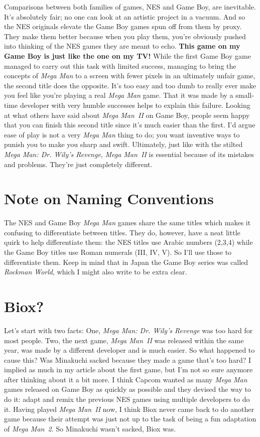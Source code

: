 \documentclass{book}
\begin{document}
Comparisons between both families of games, NES and Game Boy, are inevitable. It’s absolutely fair; no one can look at an artistic project in a vacuum. And so the NES originals elevate the Game Boy games spun off from them by proxy. They make them better because when you play them, you’re obviously pushed into thinking of the NES games they are meant to echo. \textbf{This game on my Game Boy is just like the one on my TV!} While the first Game Boy game managed to carry out this task with limited success, managing to bring the concepts of \emph{Mega Man} to a screen with fewer pixels in an ultimately unfair game, the second title does the opposite. It’s too easy and too dumb to really ever make you feel like you’re playing a real \emph{Mega Man} game. That it was made by a small-time developer with very humble successes helps to explain this failure. Looking at what others have said about \emph{Mega Man II} on Game Boy, people seem happy that you can finish this second title since it’s much easier than the first. I’d argue ease of play is not a very \emph{Mega Man} thing to do; you want inventive ways to punish you to make you sharp and swift. Ultimately, just like with the stilted \emph{Mega Man: Dr. Wily’s Revenge}, \emph{Mega Man II} is essential because of its mistakes and problems. They’re just completely different.

\FloatBarrier\needspace{5pt}\section*{Note on Naming Conventions}\nopagebreak[4]

The NES and Game Boy \emph{Mega Man} games share the same titles which makes it confusing to differentiate between titles. They do, however, have a neat little quirk to help differentiate them: the NES titles use Arabic numbers (2,3,4) while the Game Boy titles use Roman numerals (III, IV, V). So I’ll use those to differentiate them. Keep in mind that in Japan the Game Boy series was called \emph{Rockman World}, which I might also write to be extra clear.

\FloatBarrier\needspace{5pt}\section*{Biox?}\nopagebreak[4]

Let’s start with two facts: One, \emph{Mega Man: Dr. Wily’s Revenge} was too hard for most people. Two, the next game, \emph{Mega Man II} was released within the same year, was made by a different developer and is much easier. So what happened to cause this? Was Minakuchi sacked because they made a game that’s too hard? I implied as much in my article about the first game, but I’m not so sure anymore after thinking about it a bit more. I think Capcom wanted as many \emph{Mega Man} games released on Game Boy as quickly as possible and they devised the way to do it: adapt and remix the previous NES games using multiple developers to do it. Having played \emph{Mega Man II} now, I think Biox never came back to do another game because their attempt was just not up to the task of being a fun adaptation of \emph{Mega Man 2}. So Minakuchi wasn’t sacked, Biox was.
\end{document}
